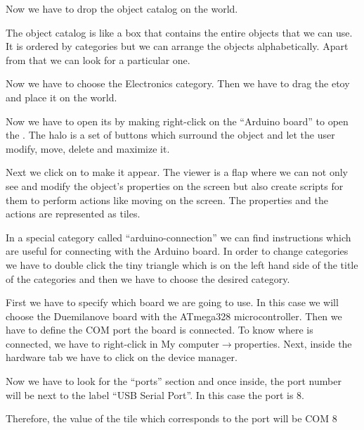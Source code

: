 \documentclass[english]{etoys-guide}
\begin{document}

Now we have to drop the object catalog on the world. 


The object catalog is like a box that contains the entire objects that we can
use. It is ordered by categories but we can arrange the objects alphabetically.
Apart from that we can look for a particular one.

Now we have to choose the Electronics category. Then we have to drag the
 etoy and place it on the world.

  
Now we have to open its  by making right-click on the “Arduino board” to
open the . The halo is a set of buttons which surround the object and let
the user modify, move, delete and maximize it.  

Next we click on  to make it appear. The viewer is
a flap where we can not only see and modify the object’s properties on the
screen but also create scripts for them to perform actions like moving on the
screen. The properties and the actions are represented as tiles.



In a special category called ``arduino-connection'' we can find instructions
which are useful for connecting with the Arduino board. In order to change
categories we have to double click the tiny triangle which is on the left hand
side of the title of the categories and then we have to choose the desired
category. 


First we have to specify which board we are going to use.  In this case we will
choose the Duemilanove board with the ATmega328 microcontroller. Then we have
to define the COM port the board is connected. To know where is connected, we
have to right-click in My computer$\rightarrow$properties. Next, inside the
hardware tab we have to click on the device manager. 


Now we have to look for the “ports” section and once inside, the port number
will be next to the label “USB Serial Port”. In this case the port is 8. 
 

Therefore, the value of the tile which corresponds to the port will be COM 8
\end{document}
